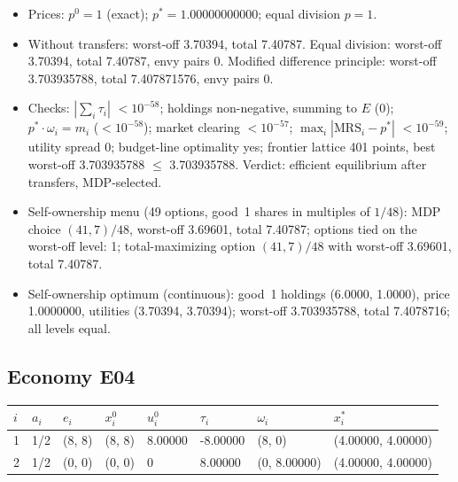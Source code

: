 \begin{itemize}[leftmargin=1.2em,itemsep=0pt,topsep=2pt]\footnotesize
\item Prices: $p^0 = 1$ (exact); $p^* = 1.00000000000$; equal division $p = 1$.
\item Without transfers: worst-off 3.70394, total 7.40787. Equal division: worst-off 3.70394, total 7.40787, envy pairs 0. Modified difference principle: worst-off 3.703935788, total 7.407871576, envy pairs 0.
\item Checks: $|\sum_i\tau_i|$ $<10^{-58}$; holdings non-negative, summing to $E$ (0); $p^*\cdot\omega_i = m_i$ ($<10^{-58}$); market clearing $<10^{-57}$; $\max_i|\mathrm{MRS}_i - p^*|$ $<10^{-59}$; utility spread 0; budget-line optimality yes; frontier lattice 401 points, best worst-off 3.703935788 $\leq$ 3.703935788. Verdict: efficient equilibrium after transfers, MDP-selected.
\item Self-ownership menu (49 options, good~1 shares in multiples of $1/48$): MDP choice $(41, 7)/48$, worst-off 3.69601, total 7.40787; options tied on the worst-off level: 1; total-maximizing option $(41, 7)/48$ with worst-off 3.69601, total 7.40787.
\item Self-ownership optimum (continuous): good~1 holdings (6.0000, 1.0000), price 1.0000000, utilities (3.70394, 3.70394); worst-off 3.703935788, total 7.4078716; all levels equal.
\end{itemize}

\subsection*{Economy E04}
\label{ec:E04}
{\scriptsize\setlength{\tabcolsep}{3pt}
\begin{tabular}{@{}llllllll@{}}
\toprule
$i$ & $a_i$ & $e_i$ & $x^0_i$ & $u^0_i$ & $\tau_i$ & $\omega_i$ & $x^*_i$ \\
\midrule
1 & 1/2 & (8, 8) & (8, 8) & 8.00000 & -8.00000 & (8, 0) & (4.00000, 4.00000) \\
2 & 1/2 & (0, 0) & (0, 0) & 0 & 8.00000 & (0, 8.00000) & (4.00000, 4.00000) \\
\bottomrule\end{tabular}}

